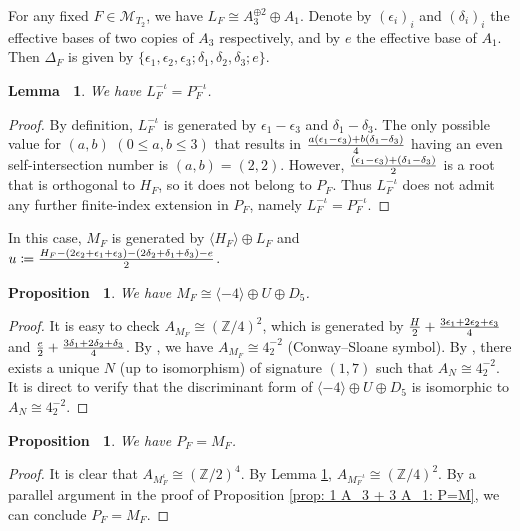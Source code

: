 \documentclass[12pt,reqno,a4paper]{amsart}
\newtheorem{lem}[thm]{Lemma~}
\newtheorem{prop}[thm]{Proposition~}
\theoremstyle{remark}
\theoremstyle{definition}
\begin{document}
For any fixed $F\in\mathcal{M}_{T_2}$, we have $L_F\cong A_3^{\oplus 2}\oplus A_1$.
Denote by $(\epsilon_i)_i$ and $(\delta_i)_i$ the effective bases of two copies of $A_3$ respectively, and by $e$ the effective base of $A_1$.
Then $\Delta_F$ is given by $\{ \epsilon_1,\epsilon_2,\epsilon_3;\delta_1,\delta_2,\delta_3;e \}$.
\begin{lem}
\label{lem: 2 A_3 + 1 A_1: L^-iota = P^-iota}
    We have $L_F^{-\iota}=P_F^{-\iota}$.
\end{lem}
\begin{proof}
    By definition, $L_F^{-\iota}$ is generated by $\epsilon_1-\epsilon_3$ and $\delta_1-\delta_3$.
    The only possible value for $(a,b)$ $(0\le a,b\le 3)$ that results in $a(\epsilon_1-\epsilon_3)+b(\delta_1-\delta_3)\over4$ having an even self-intersection number is $(a,b)=(2,2)$.
    However, $(\epsilon_1-\epsilon_3)+(\delta_1-\delta_3)\over2$ is a root that is orthogonal to $H_F$, so it does not belong to $P_F$. 
    Thus $L_F^{-\iota}$ does not admit any further finite-index extension in $P_F$, namely $L_F^{-\iota} = P_F^{-\iota}$.
\end{proof}
In this case, $M_F$ is generated by $\langle H_F\rangle\oplus L_F$ and $u\coloneqq {H_F-(2\epsilon_2+\epsilon_1+\epsilon_3)-(2\delta_2+\delta_1+\delta_3)-e\over2}$.
\begin{prop}
    We have $M_F \cong \langle -4 \rangle\oplus U\oplus D_5$.
\end{prop}
\begin{proof}
    It is easy to check $A_{M_F}\cong(\mathbb{Z}/4)^2$, which is generated by ${H\over2}+{3\epsilon_1+2\epsilon_2+\epsilon_3\over4}$ and ${e\over2}+{3\delta_1+2\delta_2+\delta_3\over4}$.
    By \cite[Chapter 15, \S 7.4]{conway1999sphere}, we have $A_{M_F}\cong 4^{-2}_{2}$ (Conway--Sloane symbol).
    By \cite[Cor 1.13.3]{nikulin1979integer}, there exists a unique $N$ (up to isomorphism) of signature $(1,7)$ such that $A_N\cong 4^{-2}_{2}$.
    It is direct to verify that the discriminant form of $\langle -4 \rangle\oplus U\oplus D_5$ is isomorphic to $A_N\cong 4^{-2}_{2}$.
\end{proof}
\begin{prop}
    We have $P_F=M_F$. 
\end{prop}
\begin{proof}
        It is clear that $A_{M_F^\iota}\cong(\mathbb{Z}/2)^4$. 
    By Lemma \ref{lem: 2 A_3 + 1 A_1: L^-iota = P^-iota}, $A_{M_F^{-\iota}}\cong(\mathbb{Z}/4)^2$.
    By a parallel argument in the proof of Proposition \ref{prop: 1 A_3 + 3 A_1: P=M}, we can conclude $P_F=M_F$.
\end{proof}
\end{document}
